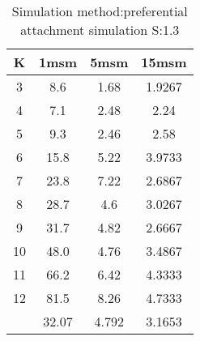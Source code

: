 \begin{table}[H]
\centering
\begin{tabular}{c|ccc}
K &1msm &5msm &15msm\\
\hline
3 & 8.6 & 1.68 & 1.9267\\
4 & 7.1 & 2.48 & 2.24\\
5 & 9.3 & 2.46 & 2.58\\
6 & 15.8 & 5.22 & 3.9733\\
7 & 23.8 & 7.22 & 2.6867\\
8 & 28.7 & 4.6 & 3.0267\\
9 & 31.7 & 4.82 & 2.6667\\
10 & 48.0 & 4.76 & 3.4867\\
11 & 66.2 & 6.42 & 4.3333\\
12 & 81.5 & 8.26 & 4.7333\\
\hline
& 32.07 & 4.792 & 3.1653\\
\end{tabular}
\caption{Simulation method:preferential attachment simulation S:1.3}
\label{tab:s1.3}
\end{table}
